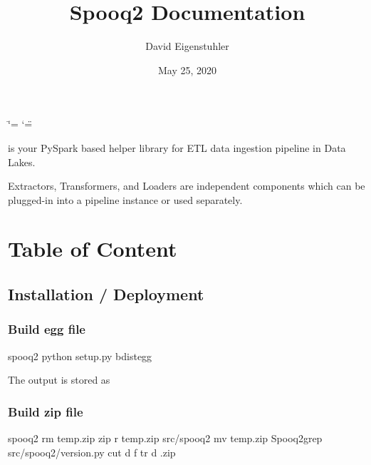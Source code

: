 \documentclass[a4paper,10pt, twoside,english]{sphinxmanual}
\title{Spooq2 Documentation}
\date{May 25, 2020}
\author{David Eigenstuhler}
\begin{document}
\ifdefined\shorthandoff
  \ifnum\catcode`\=\string=\active\shorthandoff{=}\fi
  \ifnum\catcode`\"=\active{}\fi
\fi

\pagestyle{empty}
\sphinxmaketitle
\pagestyle{plain}
\sphinxtableofcontents
\pagestyle{normal}
\label{\detokenize{index::doc}}


 is your PySpark based helper library for ETL data ingestion pipeline in Data Lakes.

Extractors, Transformers, and Loaders are independent components which can be plugged-in into a pipeline instance or used separately.


\chapter{Table of Content}
\label{\detokenize{index:table-of-content}}

\section{Installation / Deployment}
\label{\detokenize{installation:installation-deployment}}\label{\detokenize{installation::doc}}

\subsection{Build egg file}
\label{\detokenize{installation:build-egg-file}}
\begin{sphinxVerbatim}[commandchars=\\\{\}]
\PYGZdl{}  spooq2
\PYGZdl{} python setup.py bdist\PYGZus{}egg
\end{sphinxVerbatim}

The output is stored as 


\subsection{Build zip file}
\label{\detokenize{installation:build-zip-file}}
\begin{sphinxVerbatim}[commandchars=\\\{\}]
\PYGZdl{}  spooq2
\PYGZdl{} rm temp.zip
\PYGZdl{} zip \PYGZhy{}r temp.zip src/spooq2
\PYGZdl{} mv temp.zip Spooq2\PYGZus{}grep  src/spooq2/\PYGZus{}version.py  
    cut \PYGZhy{}d  \PYGZhy{}f   tr \PYGZhy{}d .zip
\end{sphinxVerbatim}
\end{document}
